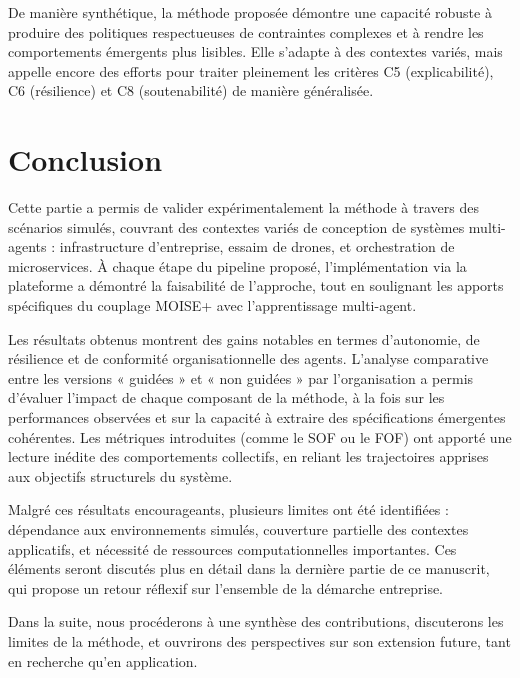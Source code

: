 De manière synthétique, la méthode proposée démontre une capacité robuste à produire des politiques respectueuses de contraintes complexes et à rendre les comportements émergents plus lisibles. Elle s’adapte à des contextes variés, mais appelle encore des efforts pour traiter pleinement les critères C5 (explicabilité), C6 (résilience) et C8 (soutenabilité) de manière généralisée.


\clearpage
\thispagestyle{empty}
\null
\newpage


\chapter*{Conclusion}

Cette partie a permis de valider expérimentalement la méthode  à travers des scénarios simulés, couvrant des contextes variés de conception de systèmes multi-agents : infrastructure d’entreprise, essaim de drones, et orchestration de microservices. À chaque étape du pipeline proposé, l’implémentation via la plateforme  a démontré la faisabilité de l’approche, tout en soulignant les apports spécifiques du couplage MOISE+ avec l’apprentissage multi-agent.

Les résultats obtenus montrent des gains notables en termes d’autonomie, de résilience et de conformité organisationnelle des agents. L’analyse comparative entre les versions « guidées » et « non guidées » par l’organisation a permis d’évaluer l’impact de chaque composant de la méthode, à la fois sur les performances observées et sur la capacité à extraire des spécifications émergentes cohérentes. Les métriques introduites (comme le SOF ou le FOF) ont apporté une lecture inédite des comportements collectifs, en reliant les trajectoires apprises aux objectifs structurels du système.

Malgré ces résultats encourageants, plusieurs limites ont été identifiées : dépendance aux environnements simulés, couverture partielle des contextes applicatifs, et nécessité de ressources computationnelles importantes. Ces éléments seront discutés plus en détail dans la dernière partie de ce manuscrit, qui propose un retour réflexif sur l’ensemble de la démarche entreprise.

\vspace{1em}

\noindent
Dans la suite, nous procéderons à une synthèse des contributions, discuterons les limites de la méthode, et ouvrirons des perspectives sur son extension future, tant en recherche qu’en application.
